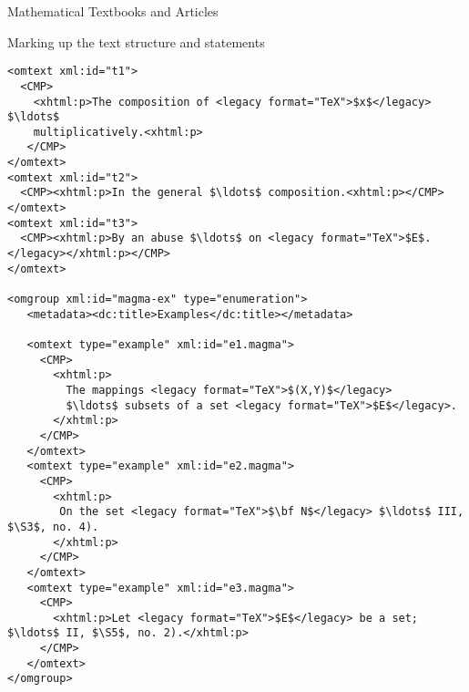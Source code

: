 \begin{tchapter}[id=algebra,short=Textbooks and Articles]{Mathematical Textbooks and Articles}
\begin{tsection}[id=top-level,short=Structure and Statements]{Marking up the text
    structure and statements}
\begin{lstlisting}[label=lst:segmented-text,mathescape,frame=topline,
    caption={The segmented text},
    index={theory,symbol,definition,omtext,CMP,omgroup,metadata,dc:title,example}]
<omtext xml:id="t1">
  <CMP>
    <xhtml:p>The composition of <legacy format="TeX">$x$</legacy> $\ldots$
    multiplicatively.<xhtml:p>
   </CMP>
</omtext>
<omtext xml:id="t2">
  <CMP><xhtml:p>In the general $\ldots$ composition.<xhtml:p></CMP>
</omtext>
<omtext xml:id="t3">
  <CMP><xhtml:p>By an abuse $\ldots$ on <legacy format="TeX">$E$.</legacy></xhtml:p></CMP>
</omtext> 

<omgroup xml:id="magma-ex" type="enumeration">
   <metadata><dc:title>Examples</dc:title></metadata>

   <omtext type="example" xml:id="e1.magma">
     <CMP>
       <xhtml:p>
         The mappings <legacy format="TeX">$(X,Y)$</legacy> 
         $\ldots$ subsets of a set <legacy format="TeX">$E$</legacy>.
       </xhtml:p>
     </CMP>
   </omtext>
   <omtext type="example" xml:id="e2.magma">
     <CMP>
       <xhtml:p>
        On the set <legacy format="TeX">$\bf N$</legacy> $\ldots$ III, $\S3$, no. 4).
       </xhtml:p>
     </CMP>
   </omtext>
   <omtext type="example" xml:id="e3.magma">
     <CMP>
       <xhtml:p>Let <legacy format="TeX">$E$</legacy> be a set; $\ldots$ II, $\S5$, no. 2).</xhtml:p>
     </CMP>
   </omtext>
</omgroup>
\end{lstlisting}


\end{tsection}
\end{tchapter}
